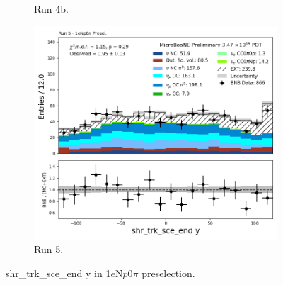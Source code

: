 \begin{figure}[H]
\begin{subfigure}[t]{0.32\linewidth}
        \caption{Run 4b.}
    \end{subfigure}%
    \hspace{0.2cm}%
    \begin{subfigure}[t]{0.32\linewidth}
        \includegraphics[width=\linewidth]{technote/Appendix_Preselection/Figures/1eNp0pi/Run5/shr_trk_sce_end_y_Run5_1eNp0pi_Presel.png}
        \caption{Run 5.}
    \end{subfigure}
    \caption{shr\_trk\_sce\_end y in 1$e$N$p$0$\pi$ preselection.}
\end{figure}

